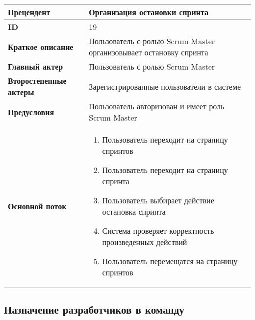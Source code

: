 \documentclass[14pt,a4paper]{extarticle}
\begin{document}
\begin{tabular}{|l|p{9cm}|}
	\hline
	\textbf{Прецендент}            & Организация остановки спринта                                                 \\
	\hline
	\textbf{ID}                    & 19                                                                            \\
	\hline
	\textbf{Краткое описание}      & Пользователь с ролью Scrum Master организовывает остановку спринта            \\
	\hline
	\textbf{Главный актер}         & Пользователь с ролью Scrum Master                                             \\
	\hline
	\textbf{Второстепенные актеры} & Зарегистрированные пользователи в системе                                     \\
	\hline
	\textbf{Предусловия}           & Пользователь авторизован и имеет роль Scrum Master                            \\
	\hline
	\textbf{Основной поток}        & \begin{enumerate}
		                                 \item Пользователь переходит на страницу спринтов
		                                 \item Пользователь переходит на страницу спринта
					         \item Пользователь выбирает действие остановка спринта
		                                 \item Система проверяет корректность произведенных действий
						 \item Пользователь перемещатся на страницу спринтов
	                                 \end{enumerate} \\
	\hline
\end{tabular}

\subsection{Назначение разработчиков в команду}
\end{document}
